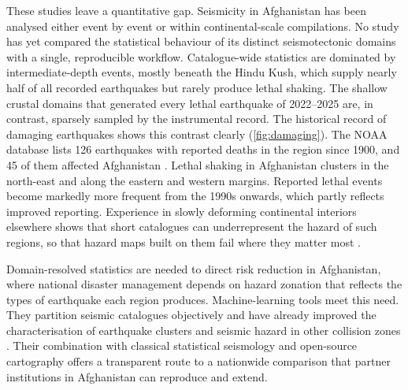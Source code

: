 \documentclass[11pt]{article}
\begin{document}
These studies leave a quantitative gap. Seismicity in Afghanistan has been analysed
either event by event or within continental-scale compilations. No study has yet
compared the statistical behaviour of its distinct seismotectonic domains with a
single, reproducible workflow. Catalogue-wide statistics are dominated by
intermediate-depth events, mostly beneath the Hindu Kush, which supply nearly half
of all recorded earthquakes but rarely produce lethal shaking. The shallow crustal domains that generated every lethal
earthquake of 2022--2025 are, in contrast, sparsely sampled by the instrumental
record. The historical record of damaging earthquakes shows this contrast clearly
(\cref{fig:damaging}). The NOAA database lists 126 earthquakes with reported deaths
in the region since 1900, and 45 of them affected Afghanistan \cite{NOAA_SigEQ}.
Lethal shaking in Afghanistan clusters in the north-east and along the eastern and
western margins. Reported lethal events become markedly more frequent from the
1990s onwards, which partly reflects improved reporting. Experience in slowly deforming continental interiors elsewhere shows that
short catalogues can underrepresent the hazard of such regions, so that hazard maps
built on them fail where they matter most \cite{Stein2012, Liu2016, Calais2016,
England2011}.

Domain-resolved statistics are needed to direct risk reduction in Afghanistan,
where national disaster management depends on hazard zonation that reflects the
types of earthquake each region produces. Machine-learning tools meet this need.
They partition seismic catalogues objectively and have already improved the
characterisation of earthquake clusters and seismic hazard in other collision zones \cite{Bergen2019, Kong2018, Lemenkova202606, Mousavi2022,
Zaliapin2016}. Their combination with classical statistical seismology and
open-source cartography offers a transparent route to a nationwide comparison that
partner institutions in Afghanistan can reproduce and extend.
\end{document}
